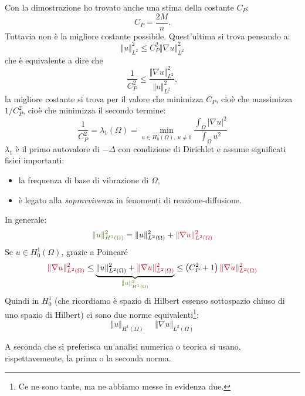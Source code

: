 \documentclass[10pt,a4paper,twoside,openright]{book}
\begin{document}
\begin{oss}
	Con la dimostrazione ho trovato anche una stima della costante $\displaystyle C_{P}$:
	\begin{equation*}
		C_{P} =\frac{2M}{n} .
	\end{equation*}
	Tuttavia non è la migliore costante possibile. Quest'ultima si trova pensando a:
	\begin{equation*}
		\Vert u\Vert _{L^{2}}^{2} \leqslant C_{P}^{2}\Vert \nabla u\Vert _{L^{2}}^{2}
	\end{equation*}
	che è equivalente a dire che
	\begin{equation*}
		\frac{1}{C_{P}^{2}} \leqslant \frac{\Vert \nabla u\Vert _{L^{2}}^{2}}{\Vert u\Vert _{L^{2}}^{2}} ,
	\end{equation*}
	la migliore costante si trova per il valore che minimizza $\displaystyle C_{P}$, cioè che massimizza $\displaystyle 1/C_{P}^{2}$, cioè che minimizza il secondo termine:
	\begin{equation}
		\frac{1}{C_{P}^{2}} =\lambda _{1}(\Omega) =\min_{u\in H_{0}^{1}(\Omega) ,\ u\neq 0}\frac{\int _{\Omega }| \nabla u| ^{2}}{\int _{\Omega } u^{2}}
	\end{equation}
	$\displaystyle \lambda _{1}$ è il primo autovalore di $\displaystyle -\Delta $ con condizione di Dirichlet e assume significati fisici importanti:
	\begin{itemize}
		\item la frequenza di base di vibrazione di $\displaystyle \Omega $,
		\item è legato alla \textit{sopravvivenza} in fenomenti di reazione-diffusione.
	\end{itemize}
\end{oss}
\begin{oss}
	In generale:
	\begin{equation*}
		\textcolor[rgb]{0.25,0.46,0.02}{\Vert u\Vert _{H^{1}(\Omega)}^{2}} =\Vert u\Vert _{L^{2}(\Omega)}^{2} +\textcolor[rgb]{0.82,0.01,0.11}{\Vert \nabla u\Vert _{L^{2}(\Omega)}^{2}}
	\end{equation*}
	Se $\displaystyle u\in H_{0}^{1}(\Omega)$, grazie a Poincaré
	\begin{equation}
		\textcolor[rgb]{0.82,0.01,0.11}{\Vert \nabla u\Vert _{L^{2}(\Omega)}^{2}} \leqslant \underbrace{\Vert u\Vert _{L^{2}(\Omega)}^{2} +\textcolor[rgb]{0.82,0.01,0.11}{\Vert \nabla u\Vert _{L^{2}(\Omega)}^{2}}}_{\textcolor[rgb]{0.25,0.46,0.02}{\Vert u\Vert _{H^{1}(\Omega)}^{2}}} \leqslant \left(C_{P}^{2} +1\right)\textcolor[rgb]{0.82,0.01,0.11}{\Vert \nabla u\Vert _{L^{2}(\Omega)}^{2}}
		\label{eq:af-stima-poincare}
	\end{equation}
	Quindi in $\displaystyle H_{0}^{1}$ (che ricordiamo è spazio di Hilbert essenso sottospazio chiuso di uno spazio di Hilbert) ci sono due norme equivalenti\footnote{Ce ne sono tante, ma ne abbiamo messe in evidenza due.}:
	\begin{equation*}
		\Vert u\Vert _{H^{1}(\Omega)} \ \ \ \ \ \ \Vert \nabla u\Vert _{L^{2}(\Omega)}
	\end{equation*}
\end{oss}
A seconda che si preferisca un'analisi numerica o teorica si usano, rispettavemente, la prima o la seconda norma.
\end{document}
